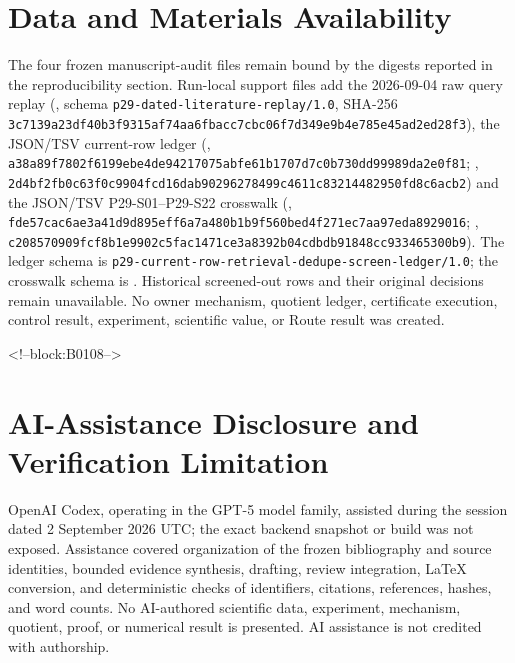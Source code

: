 \documentclass[11pt,a4paper]{article}
\begin{document}
\section*{Data and Materials Availability}
\begingroup\sloppy
The four frozen manuscript-audit files remain bound by the digests reported in the reproducibility section. Run-local support files add the 2026-09-04 raw query replay (, schema \texttt{p29-dated-literature-replay/1.0}, SHA-256 \texttt{3c7139a2\allowbreak{}3df40b3f\allowbreak{}9315af74\allowbreak{}aa6fbacc\allowbreak{}7cbc06f7\allowbreak{}d349e9b4\allowbreak{}e785e45a\allowbreak{}d2ed28f3}), the JSON/TSV current-row ledger (, \texttt{a38a89f7\allowbreak{}802f6199\allowbreak{}ebe4de94\allowbreak{}217075ab\allowbreak{}fe61b170\allowbreak{}7d7c0b73\allowbreak{}0dd99989\allowbreak{}da2e0f81}; , \texttt{2d4bf2fb\allowbreak{}0c63f0c9\allowbreak{}904fcd16\allowbreak{}dab90296\allowbreak{}278499c4\allowbreak{}611c8321\allowbreak{}4482950f\allowbreak{}d8c6acb2}) and the JSON/TSV P29-S01--P29-S22 crosswalk (, \texttt{fde57cac\allowbreak{}6ae3a41d\allowbreak{}9d895eff\allowbreak{}6a7a480b\allowbreak{}1b9f560b\allowbreak{}ed4f271e\allowbreak{}c7aa97ed\allowbreak{}a8929016}; , \texttt{c2085709\allowbreak{}09fcf8b1\allowbreak{}e9902c5f\allowbreak{}ac1471ce\allowbreak{}3a8392b0\allowbreak{}4cdbdb91\allowbreak{}848cc933\allowbreak{}465300b9}). The ledger schema is \texttt{p29-current-row-retrieval-dedupe-screen-ledger/1.0}; the crosswalk schema is . Historical screened-out rows and their original decisions remain unavailable. No owner mechanism, quotient ledger, certificate execution, control result, experiment, scientific value, or Route result was created.\par\endgroup

<!--block:B0108-->
\section*{AI-Assistance Disclosure and Verification Limitation}
OpenAI Codex, operating in the GPT-5 model family, assisted during the session dated 2 September 2026 UTC; the exact backend snapshot or build was not exposed. Assistance covered organization of the frozen bibliography and source identities, bounded evidence synthesis, drafting, review integration, LaTeX conversion, and deterministic checks of identifiers, citations, references, hashes, and word counts. No AI-authored scientific data, experiment, mechanism, quotient, proof, or numerical result is presented. AI assistance is not credited with authorship.
\end{document}
